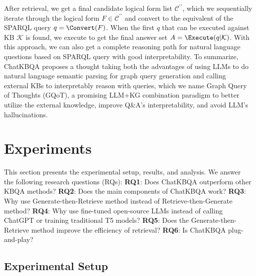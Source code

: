 \documentclass{article} \usepackage{iclr2024_conference,times}
\begin{document}
After retrieval, we get a final candidate logical form list $\mathcal{C}^{\prime\prime}$, which we sequentially iterate through the logical form $F \in \mathcal{C}^{\prime\prime}$ and convert to the equivalent of the SPARQL query $q=\Convert(F)$. When the first $q$ that can be executed against KB $\mathcal{K}$ is found, we execute to get the final answer set $A=\Execute(q|\mathcal{K})$. With this approach, we can also get a complete reasoning path for natural language questions based on SPARQL query with good interpretability. To summarize, ChatKBQA proposes a thought taking both the advantages of using LLMs to do natural language semantic parsing for graph query generation and calling external KBs to interpretably reason with queries, which we name Graph Query of Thoughts (GQoT), a promising LLM+KG combination paradigm to better utilize the external knowledge, improve Q\&A's interpretability, and avoid LLM's hallucinations.



\section{Experiments}


This section presents the experimental setup, results, and analysis. We answer the following research questions (RQs):
\textbf{RQ1}: Does ChatKBQA outperform other KBQA methods?
\textbf{RQ2}: Does the main components of ChatKBQA work?
\textbf{RQ3}: Why use Generate-then-Retrieve method instead of Retrieve-then-Generate method?
\textbf{RQ4}: Why use fine-tuned open-source LLMs instead of calling ChatGPT or training traditional T5 models?
\textbf{RQ5}: Does the Generate-then-Retrieve method improve the efficiency of retrieval?
\textbf{RQ6}: Is ChatKBQA plug-and-play?



\subsection{Experimental Setup}
\end{document}
